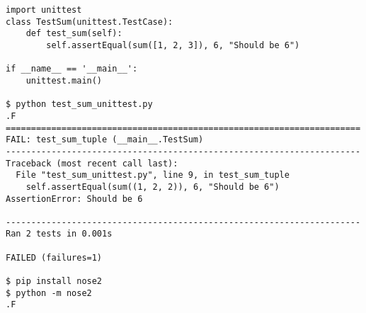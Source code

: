 
\begin{lstlisting}
import unittest
class TestSum(unittest.TestCase):
    def test_sum(self):
        self.assertEqual(sum([1, 2, 3]), 6, "Should be 6")

if __name__ == '__main__':
    unittest.main()

$ python test_sum_unittest.py
.F
======================================================================
FAIL: test_sum_tuple (__main__.TestSum)
----------------------------------------------------------------------
Traceback (most recent call last):
  File "test_sum_unittest.py", line 9, in test_sum_tuple
    self.assertEqual(sum((1, 2, 2)), 6, "Should be 6")
AssertionError: Should be 6

----------------------------------------------------------------------
Ran 2 tests in 0.001s

FAILED (failures=1)

$ pip install nose2
$ python -m nose2
.F
\end{lstlisting}
